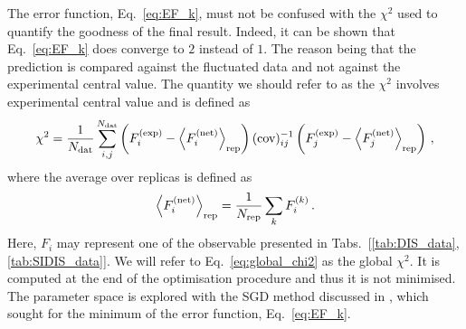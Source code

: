 The error function, Eq.~\eqref{eq:EF_k}, must not be confused with the $\chi^2$ used to quantify the goodness of the final result. Indeed, it can be shown that Eq.~\eqref{eq:EF_k} does converge to $2$ instead of $1$. The reason being that the prediction is compared against the fluctuated data and not against the experimental central value. The quantity we should refer to as the $\chi^2$ involves 
experimental central value and is defined as
\begin{equation}
  \chi^2 = \frac{1}{N_{\textrm{dat}}} \sum_{i,j}^{N_{\textrm{dat}}} \left( F_{i}^{\textrm{(exp)}} - \left<F_{i}^{\textrm{(net)}}\right>_{\textrm{rep}} \right) (\textrm{cov})^{-1}_{ij} \left( F_{j}^{\textrm{(exp)}} - \left<F_{j}^{\textrm{(net)}}\right>_{\textrm{rep}} \right) \,,
  \label{eq:global_chi2}
\end{equation}
where the average over replicas is defined as
\begin{equation}
  \left< F_i^{\textrm{(net)}} \right>_{\textrm{rep}} = \frac{1}{N_{\textrm{rep}}} \sum_{k} F^{(k)}_i \,.
\end{equation}
Here, $F_i$ may represent one of the observable presented in Tabs.~[\ref{tab:DIS_data},\ref{tab:SIDIS_data}]. We will refer to Eq.~\eqref{eq:global_chi2} as the global $\chi^2$. It is computed at the end of the optimisation procedure and thus it is not minimised. The parameter space is explored with the SGD method discussed in , which sought for the minimum of the error function, Eq.~\eqref{eq:EF_k}.%

